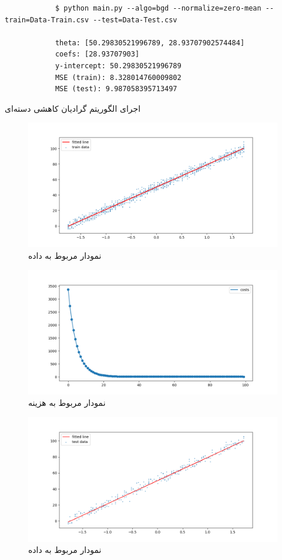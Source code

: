 \documentclass[]{article}
\begin{document}
\begin{code}
	\begin{latin}
		\begin{verbatim}
			$ python main.py --algo=bgd --normalize=zero-mean --train=Data-Train.csv --test=Data-Test.csv 
			
			theta: [50.29830521996789, 28.93707902574484]
			coefs: [28.93707903]
			y-intercept: 50.29830521996789
			MSE (train): 8.328014760009802
			MSE (test): 9.987058395713497
		\end{verbatim}
	\end{latin}
	\caption{اجرای الگوریتم گرادیان کاهشی دسته‌ای}
	\label{image:run bgd}
\end{code}
\begin{figure}[h]
	\centering
	\includegraphics[width=1\linewidth]{bgd-train}
	\caption{نمودار مربوط به داده }
	\label{fig:bgd-train}
\end{figure}
\begin{figure}[h]
	\centering
	\includegraphics[width=1\linewidth]{bgd-costs}
	\caption{نمودار مربوط به هزینه}
	\label{fig:bgd-costs}
\end{figure}
\begin{figure}[h]
	\centering
	\includegraphics[width=1\linewidth]{bgd-test}
	\caption{نمودار مربوط به داده }
	\label{fig:bgd-test}
\end{figure}
\end{document}
